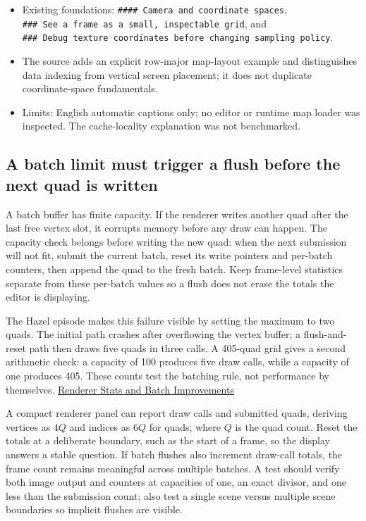 \begin{itemize}
\tightlist
\item
  Existing foundations: \texttt{\#\#\#\#\ Camera\ and\ coordinate\ spaces}, \texttt{\#\#\#\ See\ a\ frame\ as\ a\ small,\ inspectable\ grid}, and \texttt{\#\#\#\ Debug\ texture\ coordinates\ before\ changing\ sampling\ policy}.
\item
  The source adds an explicit row-major map-layout example and distinguishes data indexing from vertical screen placement; it does not duplicate coordinate-space fundamentals.
\item
  Limits: English automatic captions only; no editor or runtime map loader was inspected. The cache-locality explanation was not benchmarked.
\end{itemize}

\subsection{A batch limit must trigger a flush before the next quad is written}\label{06-engine-ii-ch026-a-batch-limit-must-trigger-a-flush-before-the-next-quad-is-written}

A batch buffer has finite capacity. If the renderer writes another quad after the last free vertex slot, it corrupts memory before any draw can happen. The capacity check belongs before writing the new quad: when the next submission will not fit, submit the current batch, reset its write pointers and per-batch counters, then append the quad to the fresh batch. Keep frame-level statistics separate from these per-batch values so a flush does not erase the totals the editor is displaying.

The Hazel episode makes this failure visible by setting the maximum to two quads. The initial path crashes after overflowing the vertex buffer; a flush-and-reset path then draws five quads in three calls. A 405-quad grid gives a second arithmetic check: a capacity of 100 produces five draw calls, while a capacity of one produces 405. These counts test the batching rule, not performance by themselves. \href{https://www.youtube.com/watch?v=KKv_pZvn2rM}{Renderer Stats and Batch Improvements}

A compact renderer panel can report draw calls and submitted quads, deriving vertices as \(4Q\) and indices as \(6Q\) for quads, where \(Q\) is the quad count. Reset the totals at a deliberate boundary, such as the start of a frame, so the display answers a stable question. If batch flushes also increment draw-call totals, the frame count remains meaningful across multiple batches. A test should verify both image output and counters at capacities of one, an exact divisor, and one less than the submission count; also test a single scene versus multiple scene boundaries so implicit flushes are visible.

